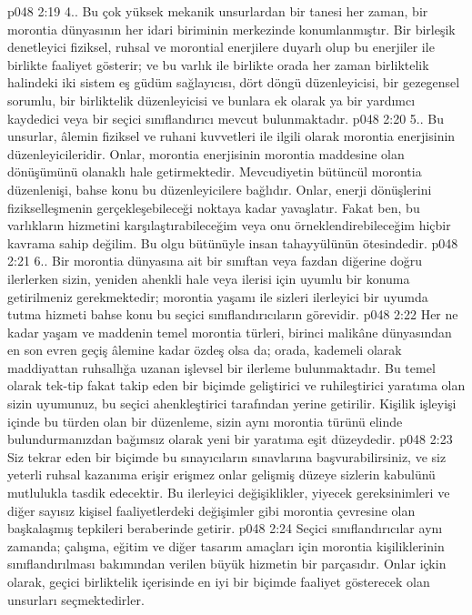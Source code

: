 \vs p048 2:19 4.\bibnobreakspace {}. Bu çok yüksek mekanik unsurlardan bir tanesi her zaman, bir morontia dünyasının her idari biriminin merkezinde konumlanmıştır. Bir birleşik denetleyici fiziksel, ruhsal ve morontial enerjilere duyarlı olup bu enerjiler ile birlikte faaliyet gösterir; ve bu varlık ile birlikte orada her zaman birliktelik halindeki iki sistem eş güdüm sağlayıcısı, dört döngü düzenleyicisi, bir gezegensel sorumlu, bir birliktelik düzenleyicisi ve bunlara ek olarak ya bir yardımcı kaydedici veya bir seçici sınıflandırıcı mevcut bulunmaktadır.
\vs p048 2:20 5.\bibnobreakspace {}. Bu unsurlar, âlemin fiziksel ve ruhani kuvvetleri ile ilgili olarak morontia enerjisinin düzenleyicileridir. Onlar, morontia enerjisinin morontia maddesine olan dönüşümünü olanaklı hale getirmektedir. Mevcudiyetin bütüncül morontia düzenlenişi, bahse konu bu düzenleyicilere bağlıdır. Onlar, enerji dönüşlerini fizikselleşmenin gerçekleşebileceği noktaya kadar yavaşlatır. Fakat ben, bu varlıkların hizmetini karşılaştırabileceğim veya onu örneklendirebileceğim hiçbir kavrama sahip değilim. Bu olgu bütünüyle insan tahayyülünün ötesindedir.
\vs p048 2:21 6.\bibnobreakspace {}. Bir morontia dünyasına ait bir sınıftan veya fazdan diğerine doğru ilerlerken sizin, yeniden ahenkli hale veya ilerisi için uyumlu bir konuma getirilmeniz gerekmektedir; morontia yaşamı ile sizleri ilerleyici bir uyumda tutma hizmeti bahse konu bu seçici sınıflandırıcıların görevidir.
\vs p048 2:22 Her ne kadar yaşam ve maddenin temel morontia türleri, birinci malikâne dünyasından en son evren geçiş âlemine kadar özdeş olsa da; orada, kademeli olarak maddiyattan ruhsallığa uzanan işlevsel bir ilerleme bulunmaktadır. Bu temel olarak tek\hyp{}tip fakat takip eden bir biçimde geliştirici ve ruhileştirici yaratıma olan sizin uyumunuz, bu seçici ahenkleştirici tarafından yerine getirilir. Kişilik işleyişi içinde bu türden olan bir düzenleme, sizin aynı morontia türünü elinde bulundurmanızdan bağımsız olarak yeni bir yaratıma eşit düzeydedir.
\vs p048 2:23 Siz tekrar eden bir biçimde bu sınayıcıların sınavlarına başvurabilirsiniz, ve siz yeterli ruhsal kazanıma erişir erişmez onlar gelişmiş düzeye sizlerin kabulünü mutlulukla tasdik edecektir. Bu ilerleyici değişiklikler, yiyecek gereksinimleri ve diğer sayısız kişisel faaliyetlerdeki değişimler gibi morontia çevresine olan başkalaşmış tepkileri beraberinde getirir.
\vs p048 2:24 Seçici sınıflandırıcılar aynı zamanda; çalışma, eğitim ve diğer tasarım amaçları için morontia kişiliklerinin sınıflandırılması bakımından verilen büyük hizmetin bir parçasıdır. Onlar içkin olarak, geçici birliktelik içerisinde en iyi bir biçimde faaliyet gösterecek olan unsurları seçmektedirler.
